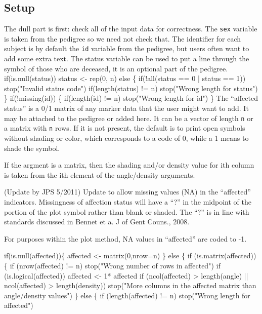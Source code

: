 \documentclass{article}
\begin{document}
\subsection{Setup}
The dull part is first: check all of the input data for
correctness.  
The {\tt{}sex} variable is taken from the pedigree so we need not check
that. 
The identifier for each subject is by default the {\tt{}id} variable from
the pedigree, but users often want to add some extra text.
The status variable can be used to put a line through the symbol
of those who are deceased, it is an optional part of the pedigree.
\nwenddocs{}\endmoddef
if(is.null(status))
  status <- rep(0, n)
else \{
    if(!all(status == 0 | status == 1))
      stop("Invalid status code")
    if(length(status) != n)
      stop("Wrong length for status")
\}
if(!missing(id)) \{
    if(length(id) != n)
      stop("Wrong length for id")
\}
\nwendcode{}\nwdocspar
The ``affected status'' is a 0/1 matrix of any marker data that the
user might want to add.  It may be attached to the pedigree or added
here.  It can be a vector of length {\tt{}n} or a matrix with {\tt{}n} rows.
If it is not present, the default is to print open symbols without
shading or color, which corresponds to a code of 0, while a 1 means to
shade the symbol.  

If the argment is a matrix, then the shading and/or density value for
ith column is taken from the ith element of the angle/density arguments.

(Update by JPS 5/2011) Update to allow missing values (NA) in the ``affected''
indicators.  Missingness of affection status will have a ``?'' in 
the midpoint of the portion of the plot symbol rather than blank or shaded.
The ``?'' is in line with standards discussed in 
Bennet et a. J of Gent Couns., 2008.

For purposes within the plot method, NA values in ``affected'' are coded 
to -1.

\nwenddocs{}\plusendmoddef
if(is.null(affected))\{
  affected <- matrix(0,nrow=n)
\}
else \{
    if (is.matrix(affected))\{
        if (nrow(affected) != n) stop("Wrong number of rows in affected")
        if (is.logical(affected)) affected <- 1* affected
        if (ncol(affected) > length(angle) || ncol(affected) > length(density))
            stop("More columns in the affected matrix than angle/density values")
        \} 
    else \{
        if (length(affected) != n)
        stop("Wrong length for affected")
\end{document}
